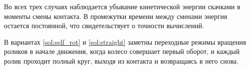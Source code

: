 
Во всех трех случаях наблюдается убывание кинетической энергии скачками в моменты смены контакта. В промежутки времени между сменами энергия остается постоянной, что свидетельствует о точности вычислений.

В вариантах \ref{sol:self_rot} и \ref{sol:straight} заметны переходные режимы вращения роликов в начале движения, когда колесо совершает первый оборот, и каждый ролик проходит полный круг, выходя из контакта и возвращаясь в него снова.

